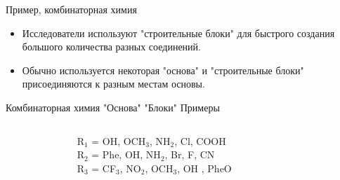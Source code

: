 \begin{frame}{Пример, комбинаторная химия}
  \begin{itemize}
      \item Исследователи используют "строительные блоки" для быстрого создания большого количества разных  соединений.
    \vspace{1cm}
      \item Обычно используется некоторая "основа"  и "строительные блоки" присоединяются к разным местам основы.
   \end{itemize}
\end{frame}

\begin{frame}{Комбинаторная химия}
          "Основа" \hspace{3cm}"Блоки" \hspace{3cm} Примеры\\
    \begin{columns}[c]
        \begin{column}{.3\textwidth}
            \vspace{1cm}
        \end{column}
        \begin{column}{.4\textwidth}
            \small 
            R$_1$ = OH, OCH$_3$, NH$_2$, Cl, COOH \\
            \vspace{0.5cm}
            R$_2$ = Phe, OH, NH$_2$, Br, F,  CN \\
            \vspace{0.5cm}
            R$_3$ = CF$_3$, NO$_2$,  OCH$_3$,  OH , PheO 
        \end{column}
        \begin{column}{.3\textwidth}
            \tiny
            \\ 
            \vspace{0.2cm}
			 \\
            \vspace{0.2cm}
             \\
        \end{column}
    \end{columns}
\end{frame}   

